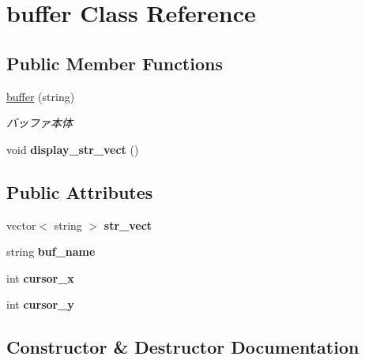 \hypertarget{classbuffer}{}\section{buffer Class Reference}
\label{classbuffer}
\subsection*{Public Member Functions}
\begin{DoxyCompactItemize}
\item 
\hyperlink{classbuffer_a01a3a6ef0ab62c11758ba464766f0e0a}{buffer} (string)
\begin{DoxyCompactList}\small\item\em バッファ本体 \end{DoxyCompactList}\item 
\hypertarget{classbuffer_a6e98cb4804c6965d27afa95a4b948e3b}{}\label{classbuffer_a6e98cb4804c6965d27afa95a4b948e3b} 
void {\bfseries display\+\_\+str\+\_\+vect} ()
\end{DoxyCompactItemize}
\subsection*{Public Attributes}
\begin{DoxyCompactItemize}
\item 
\hypertarget{classbuffer_aa8fa3015cc31657b42c0e7db1029c748}{}\label{classbuffer_aa8fa3015cc31657b42c0e7db1029c748} 
vector$<$ string $>$ {\bfseries str\+\_\+vect}
\item 
\hypertarget{classbuffer_a973ba18d831cccc85c2616de8246b368}{}\label{classbuffer_a973ba18d831cccc85c2616de8246b368} 
string {\bfseries buf\+\_\+name}
\item 
\hypertarget{classbuffer_ab184652008e028f3bf54777179a718d3}{}\label{classbuffer_ab184652008e028f3bf54777179a718d3} 
int {\bfseries cursor\+\_\+x}
\item 
\hypertarget{classbuffer_a695ee27086239076f144e2486216b1bd}{}\label{classbuffer_a695ee27086239076f144e2486216b1bd} 
int {\bfseries cursor\+\_\+y}
\end{DoxyCompactItemize}


\subsection{Constructor \& Destructor Documentation}
\hypertarget{classbuffer_a01a3a6ef0ab62c11758ba464766f0e0a}{}\label{classbuffer_a01a3a6ef0ab62c11758ba464766f0e0a} 
